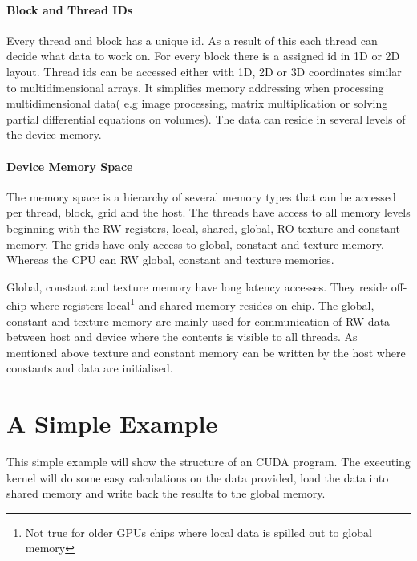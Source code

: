 \paragraph{Block and Thread IDs}%
\label{par:block_and_thread_ids} 
Every thread and block has a unique id. As a result of this each thread can
decide what data to work on. For every block there is a assigned id in \gls{1D}
or \gls{2D} layout. Thread ids can be accessed either with \gls{1D}, \gls{2D} or
\gls{3D} coordinates similar to multidimensional arrays. It simplifies memory
addressing when processing multidimensional data( e.g image processing, matrix
multiplication or solving partial differential equations on volumes). The data
can reside in several levels of the device memory. %

\paragraph{Device Memory Space}%
\label{par:device_memory_space} 
The memory space is a hierarchy of several memory types that can be accessed per
thread, block, grid and the host. The threads have access to all memory levels
beginning with the \gls{RW} registers, local, shared, global, \gls{RO}
texture and constant memory. The grids have only access to global, constant
and texture memory. Whereas the \gls{CPU} can \gls{RW} global, constant and texture
memories.

Global, constant and texture memory have long latency accesses. They reside
off-chip where registers local\footnote{Not true for older \glspl{GPU} chips
where local data is spilled out to global memory} and shared memory resides
on-chip. The global, constant and texture memory are mainly used for
communication of \gls{RW} data between host and device where the contents is
visible to all threads. As mentioned above texture and constant memory can be
written by the host where constants and data are initialised.


\section{A Simple Example}%
\label{sub:a_simple_example} 
This simple example will show the structure of an \gls{CUDA} program. The executing
kernel will do some easy calculations on the data provided, load the data into
shared memory  and write back the results to the global memory. 

